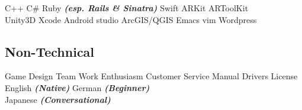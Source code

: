 \documentclass[a4paper]{deedy-resume} %
\begin{document}
\begin{minipage}[t]{0.33\textwidth}
C++ \textbullet{} C\# \textbullet{} Ruby {\footnotesize \textit{\textbf{(esp. Rails \& Sinatra)}}}
Swift \textbullet{} ARKit \textbullet{} ARToolKit \\

Unity3D \textbullet{} Xcode \textbullet{} Android studio \textbullet{} ArcGIS/QGIS \textbullet{}
Emacs \textbullet{} vim \textbullet{} Wordpress \\

\sectionspace

\subsection{Non-Technical}
Game Design \textbullet{} Team Work \textbullet{} Enthusiasm \textbullet{} Customer Service \textbullet{} Manual Drivers License\\
English {\footnotesize \textit{\textbf{(Native)}}} \textbullet{} German {\footnotesize \textit{\textbf{(Beginner)}}} \textbullet{} \\
Japanese {\footnotesize \textit{\textbf{(Conversational)}}} \\

\sectionspace %


\end{minipage} %
\hfill
%
%
\end{document}
